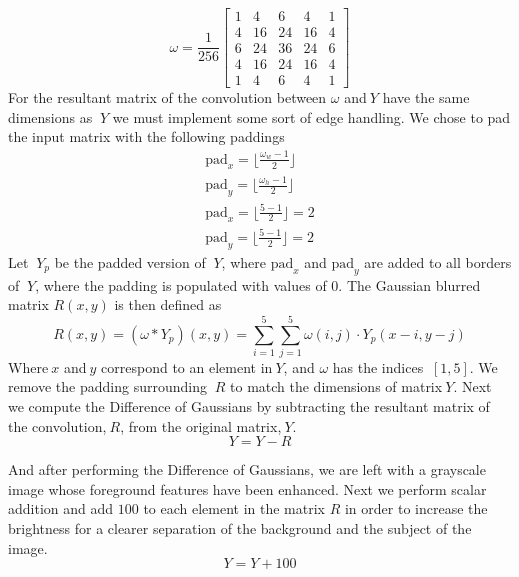 \documentclass[12pt]{article}
\begin{document}
\begin{equation}
\omega = \frac{1}{256} \begin{bmatrix}
1 & 4 & 6 & 4 & 1 \\
4 & 16 & 24 & 16 & 4 \\
6 & 24 & 36 & 24 & 6 \\
4 & 16 & 24 & 16 & 4 \\
1 & 4 & 6 & 4 & 1
\end{bmatrix}
\end{equation}
For the resultant matrix of the convolution between \(\omega \) and\(\ Y \) have the same dimensions as \(\ Y \) we must implement some sort of edge handling. We chose to pad the input matrix with the following paddings
\begin{eqnarray}
\text{pad}_{x} =\biggl  \lfloor \frac{\omega_{w}-1}{2}\biggl \rfloor\\
\text{pad}_{y} = \biggl \lfloor \frac{\omega_{h}-1}{2}\biggl \rfloor\\
\text{pad}_{x} = \biggl \lfloor \frac{5-1}{2}\biggl \rfloor = 2\\
\text{pad}_{y} = \biggl \lfloor \frac{5-1}{2}\biggl \rfloor = 2
\end{eqnarray}
Let \(\ Y_{p} \) be the padded version of \(\ Y \), where \(\text{pad}_{x} \) and \(\text{pad}_{y} \) are added to all borders of \(\ Y \), where the padding is populated with values of 0. The Gaussian blurred matrix \( R(x, y) \) is then defined as
\begin{equation}
R(x, y) = (\omega * Y_{p})(x, y) = \sum_{i=1}^{5} \sum_{j=1}^{5} \omega(i, j) \cdot Y_{p}(x-i, y-j)
\end{equation}
Where\(\ x \) and\(\ y \) correspond to an element in\(\ Y \), and \(\omega \) has the indices \(\ [1, 5] \). We remove the padding surrounding \(\ R \) to match the dimensions of matrix\(\ Y \). Next we compute the Difference of Gaussians by subtracting the resultant matrix of the convolution,\(\ R \), from the original matrix,\(\ Y \).
\begin{equation}
Y  =  Y  -  R
\end{equation}

And after performing the Difference of Gaussians, we are left with a grayscale image whose foreground features have been enhanced. Next we perform scalar addition and add \( 100 \) to each element in the matrix \( R \) in order to increase the brightness for a clearer separation of the background and the subject of the image.
\begin{equation}
Y  = Y + 100
\end{equation}
\end{document}
